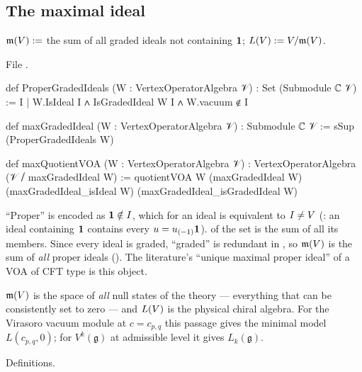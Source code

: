 \subsection{The maximal ideal}

\begin{definition}\label{l04:def:maxideal}
$\mathfrak{m}(V) :=$ the sum of all graded ideals not containing $\mathbf{1}$; $L(V) :=
V/\mathfrak{m}(V)$.
\end{definition}
\noindent File .
\begin{leancode}
def ProperGradedIdeals (W : VertexOperatorAlgebra 𝒱) : Set (Submodule ℂ 𝒱) :=
  {I | W.IsIdeal I ∧ IsGradedIdeal W I ∧ W.vacuum ∉ I}

def maxGradedIdeal (W : VertexOperatorAlgebra 𝒱) : Submodule ℂ 𝒱 :=
  sSup (ProperGradedIdeals W)

def maxQuotientVOA (W : VertexOperatorAlgebra 𝒱) :
    VertexOperatorAlgebra (𝒱 ⧸ maxGradedIdeal W) :=
  quotientVOA W (maxGradedIdeal W) (maxGradedIdeal_isIdeal W) (maxGradedIdeal_isGradedIdeal W)
\end{leancode}
\begin{dictionary}
``Proper'' is encoded as $\mathbf{1}\notin I$, which for an ideal is equivalent to $I\ne V$
(\allowbreak{}\allowbreak{}\allowbreak{}\allowbreak{}: an ideal containing $\mathbf{1}$ contains every $u = u_{(-1)}\mathbf{1}$).
 of the set is the sum of all its members. Since every ideal is graded, ``graded'' is
redundant in , so $\mathfrak{m}(V)$ is the sum of \emph{all} proper ideals
(\allowbreak{}). The literature's ``unique maximal proper ideal'' of a VOA of CFT type is
this object.
\end{dictionary}
\begin{physics}
$\mathfrak{m}(V)$ is the space of \emph{all} null states of the theory --- everything that can be
consistently set to zero --- and $L(V)$ is the physical chiral algebra. For the Virasoro vacuum
module at $c = c_{p,q}$ this passage gives the minimal model $L(c_{p,q},0)$; for $V^k(\mathfrak g)$ at
admissible level it gives $L_k(\mathfrak g)$.
\end{physics}
\begin{status}
Definitions.
\end{status}

